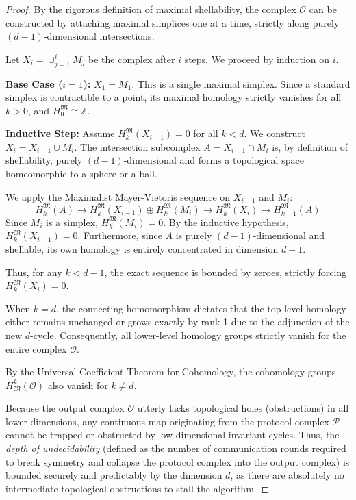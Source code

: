 \begin{proof}
By the rigorous definition of maximal shellability, the complex $\mathcal{O}$ can be constructed by attaching maximal simplices one at a time, strictly along purely $(d-1)$-dimensional intersections. 

Let $X_i = \cup_{j=1}^i M_j$ be the complex after $i$ steps. We proceed by induction on $i$.

\textbf{Base Case ($i=1$):} $X_1 = M_1$. This is a single maximal simplex. Since a standard simplex is contractible to a point, its maximal homology strictly vanishes for all $k > 0$, and $H_0^{\mathfrak{M}} \cong \mathbb{Z}$.

\textbf{Inductive Step:} Assume $H_k^{\mathfrak{M}}(X_{i-1}) = 0$ for all $k < d$. We construct $X_i = X_{i-1} \cup M_i$. The intersection subcomplex $A = X_{i-1} \cap M_i$ is, by definition of shellability, purely $(d-1)$-dimensional and forms a topological space homeomorphic to a sphere or a ball.

We apply the Maximalist Mayer-Vietoris sequence on $X_{i-1}$ and $M_i$:
\[
H_k^{\mathfrak{M}}(A) \to H_k^{\mathfrak{M}}(X_{i-1}) \oplus H_k^{\mathfrak{M}}(M_i) \to H_k^{\mathfrak{M}}(X_i) \to H_{k-1}^{\mathfrak{M}}(A)
\]
Since $M_i$ is a simplex, $H_k^{\mathfrak{M}}(M_i) = 0$. By the inductive hypothesis, $H_k^{\mathfrak{M}}(X_{i-1}) = 0$. Furthermore, since $A$ is purely $(d-1)$-dimensional and shellable, its own homology is entirely concentrated in dimension $d-1$. 

Thus, for any $k < d-1$, the exact sequence is bounded by zeroes, strictly forcing $H_k^{\mathfrak{M}}(X_i) = 0$. 

When $k = d$, the connecting homomorphism dictates that the top-level homology either remains unchanged or grows exactly by rank 1 due to the adjunction of the new $d$-cycle. Consequently, all lower-level homology groups strictly vanish for the entire complex $\mathcal{O}$.

By the Universal Coefficient Theorem for Cohomology, the cohomology groups $H^k_{\mathfrak{M}}(\mathcal{O})$ also vanish for $k \neq d$. 

Because the output complex $\mathcal{O}$ utterly lacks topological holes (obstructions) in all lower dimensions, any continuous map originating from the protocol complex $\mathcal{P}$ cannot be trapped or obstructed by low-dimensional invariant cycles. Thus, the \textit{depth of undecidability} (defined as the number of communication rounds required to break symmetry and collapse the protocol complex into the output complex) is bounded securely and predictably by the dimension $d$, as there are absolutely no intermediate topological obstructions to stall the algorithm.
\end{proof}


